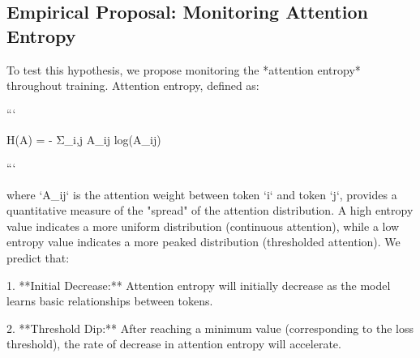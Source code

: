 \subsection{Empirical Proposal: Monitoring Attention Entropy}













To test this hypothesis, we propose monitoring the *attention entropy* throughout training.  Attention entropy, defined as:













```






H(A) = - Σ_{i,j} A_{ij} log(A_{ij})






```













where `A_{ij}` is the attention weight between token `i` and token `j`, provides a quantitative measure of the "spread" of the attention distribution.  A high entropy value indicates a more uniform distribution (continuous attention), while a low entropy value indicates a more peaked distribution (thresholded attention). We predict that:













1.  **Initial Decrease:**  Attention entropy will initially decrease as the model learns basic relationships between tokens.






2.  **Threshold Dip:** After reaching a minimum value (corresponding to the loss threshold), the rate of decrease in attention entropy will accelerate.







